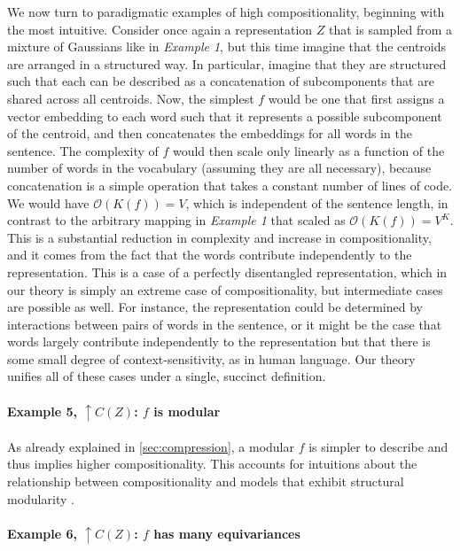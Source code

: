 \documentclass{article}
\begin{document}
\begin{appendices}
We now turn to paradigmatic examples of high compositionality, beginning with the most intuitive. Consider once again a representation $Z$ that is sampled from a mixture of Gaussians like in \textit{Example 1}, but this time imagine that the centroids are arranged in a structured way. In particular, imagine that they are structured such that each can be described as a concatenation of subcomponents that are shared across all centroids. Now, the simplest $f$ would be one that first assigns a vector embedding to each word such that it represents a possible subcomponent of the centroid, and then concatenates the embeddings for all words in the sentence. The complexity of $f$ would then scale only linearly as a function of the number of words in the vocabulary (assuming they are all necessary), because concatenation is a simple operation that takes a constant number of lines of code. We would have $\mathcal{O}(K(f)) = V$, which is independent of the sentence length, in contrast to the arbitrary mapping in \textit{Example 1} that scaled as $\mathcal{O}(K(f)) = V^K$. This is a substantial reduction in complexity and increase in compositionality, and it comes from the fact that the words contribute independently to the representation. This is a case of a perfectly disentangled representation, which in our theory is simply an extreme case of compositionality, but intermediate cases are possible as well. For instance, the representation could be determined by interactions between pairs of words in the sentence, or it might be the case that words largely contribute independently to the representation but that there is some small degree of context-sensitivity, as in human language. Our theory unifies all of these cases under a single, succinct definition.

\paragraph{Example 5, $\uparrow C(Z)$: $f$ is modular}

As already explained in \cref{sec:compression}, a modular $f$ is simpler to describe and thus implies higher compositionality. This accounts for intuitions about the relationship between compositionality and models that exhibit structural modularity \citep{lepori2023break,goyal2022inductive}.

\paragraph{Example 6, $\uparrow C(Z)$: $f$ has many equivariances}


\end{appendices}
\end{document}
